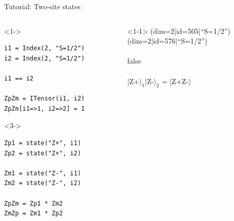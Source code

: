 \begin{frame}[fragile]{Tutorial: Two-site states}

\begin{columns}

\begin{column}{4.5cm}

\begin{onlyenv}<1->
\begin{lstlisting}[language=JuliaLocal, style=julia, basicstyle=\small]
i1 = Index(2, "S=1/2")
i2 = Index(2, "S=1/2")

i1 == i2

ZpZm = ITensor(i1, i2)
ZpZm[i1=>1, i2=>2] = 1
\end{lstlisting}
\end{onlyenv}

\begin{onlyenv}<3->
\begin{lstlisting}[language=JuliaLocal, style=julia, basicstyle=\small]
Zp1 = state("Z+", i1)
Zp2 = state("Z+", i2)

Zm1 = state("Z-", i1)
Zm2 = state("Z-", i2)

ZpZm = Zp1 * Zm2
ZmZp = Zm1 * Zp2
\end{lstlisting}
\end{onlyenv}

\end{column}

\begin{column}{5cm}

\begin{onlyenv}<1-1>
(dim=2|id=505|``S=1/2'') \\
(dim=2|id=576|``S=1/2'') \\
~\\
false \\
~\\
|Z+$\rangle_1$|Z-$\rangle_2$ = |Z+Z-$\rangle$ \\
\end{onlyenv}


\end{column}
\end{columns}
\end{frame}
